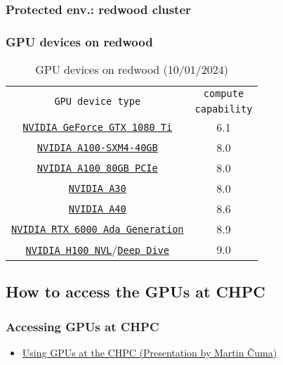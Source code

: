 \subsubsection{Protected env.: redwood cluster}
\begin{frame}
	\frametitle{GPU devices on redwood}	
\begin{table}[H]
   \begin{center}
     \begin{tabular}{c|c}
       \multirow{2}{*}{\texttt{GPU device type}} & \texttt{compute} \\
	                                               & \texttt{capability} \\
       \hline
       \href{https://www.nvidia.com/en-us/geforce/10-series/\#1080-ti-spec}{\small{\texttt{NVIDIA GeForce GTX 1080 Ti}}}    &  \small{6.1}  \\
       \href{https://www.nvidia.com/content/dam/en-zz/Solutions/Data-Center/a100/pdf/nvidia-a100-datasheet-us-nvidia-1758950-r4-web.pdf}{\small{\texttt{NVIDIA A100-SXM4-40GB}}} &  \small{8.0} \\
	     \href{https://www.nvidia.com/content/dam/en-zz/Solutions/Data-Center/a100/pdf/nvidia-a100-datasheet-us-nvidia-1758950-r4-web.pdf}{\small{\texttt{NVIDIA A100 80GB PCIe}}} &  \small{8.0} \\
	     \href{https://www.nvidia.com/content/dam/en-zz/Solutions/data-center/products/a30-gpu/pdf/a30-datasheet.pdf}{\small{\texttt{NVIDIA A30}}}   &  \small{8.0} \\
	     \href{https://images.nvidia.com/content/Solutions/data-center/a40/nvidia-a40-datasheet.pdf}{\small{\texttt{NVIDIA A40}}} &  \small{8.6} \\
	     \href{https://www.nvidia.com/content/dam/en-zz/Solutions/design-visualization/rtx-6000/proviz-print-rtx6000-datasheet-web-2504660.pdf}{\small{\texttt{NVIDIA RTX 6000 Ada Generation}}}&  \small{8.9} \\
	     \href{https://www.nvidia.com/en-us/data-center/h100/}{\texttt{NVIDIA H100 NVL}}/\href{https://www.nvidia.com/content/dam/en-zz/Solutions/Data-Center/h100/PB-11773-001\_v01.pdf}{\small{\texttt{Deep Dive}}} &  \small{9.0} \\
        \hline
     \end{tabular}
   \end{center}	   
   \caption{GPU devices on redwood (10/01/2024)}
\end{table}	   
\end{frame}

\subsection{How to access the GPUs at CHPC}
\begin{frame}
   \frametitle{Accessing GPUs at CHPC}
      \begin{itemize}
	 \item \href{https://www.chpc.utah.edu/presentations/images-and-pdfs/usinggpuss24f.pdf}{Using GPUs at the CHPC (Presentation by Martin \v{C}uma)}
      \end{itemize}		      
\end{frame}	

